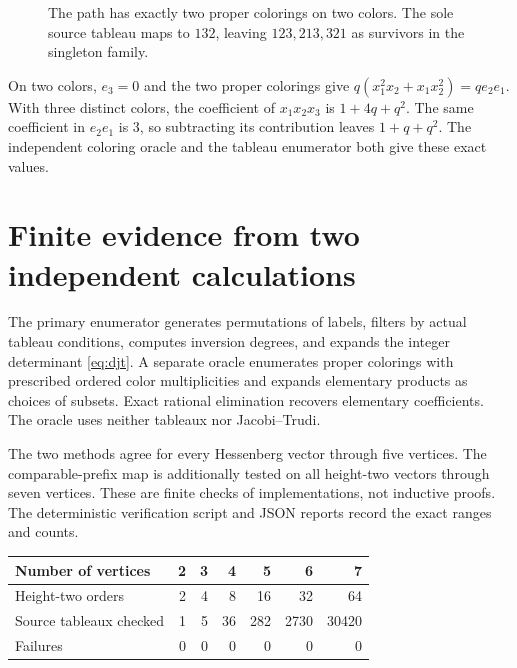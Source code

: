 \documentclass[11pt,a4paper]{article}
\theoremstyle{definition}
\newcommand{\cell}[4]{\draw[draw=ink,fill=#4,rounded corners=1pt] (#1,#2) rectangle ++(.68,.68);\node[text=ink] at (#1+.34,#2+.34) {$#3$};}
\begin{document}
\begin{figure}[ht]
\centering
{}
\caption{The path has exactly two proper colorings on two colors.
The sole source tableau maps to $132$, leaving $123,213,321$ as survivors
in the singleton family.}\label{fig:threevertex}
\end{figure}

On two colors, $e_3=0$ and the two proper colorings give
$q(x_1^2x_2+x_1x_2^2)=q e_2e_1$. With three distinct colors, the coefficient
of $x_1x_2x_3$ is $1+4q+q^2$. The same coefficient in $e_2e_1$ is $3$,
so subtracting its contribution leaves $1+q+q^2$. The independent coloring
oracle and the tableau enumerator both give these exact values.

\section{Finite evidence from two independent calculations}

The primary enumerator generates permutations of labels, filters by actual
tableau conditions, computes inversion degrees, and expands the integer
determinant \eqref{eq:djt}. A separate oracle enumerates proper colorings
with prescribed ordered color multiplicities and expands elementary products
as choices of subsets. Exact rational elimination recovers elementary
coefficients. The oracle uses neither tableaux nor Jacobi--Trudi.

The two methods agree for every Hessenberg vector through five vertices.
The comparable-prefix map is additionally tested on all height-two vectors
through seven vertices. These are finite checks of implementations, not
inductive proofs. The deterministic verification script and JSON reports
record the exact ranges and counts.

\begin{center}
\small
\begin{tabular}{lrrrrrr}
\toprule
Number of vertices & 2 & 3 & 4 & 5 & 6 & 7\\
\midrule
Height-two orders & 2 & 4 & 8 & 16 & 32 & 64\\
Source tableaux checked & 1 & 5 & 36 & 282 & 2730 & 30420\\
Failures & 0 & 0 & 0 & 0 & 0 & 0\\
\bottomrule
\end{tabular}
\end{center}
\end{document}
